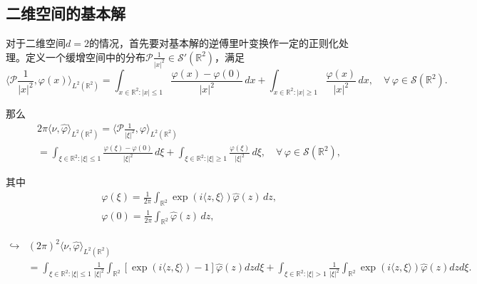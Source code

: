 \subsection{二维空间的基本解}
对于二维空间$d=2$的情况，首先要对基本解的逆傅里叶变换作一定的正则化处理\citep{Vladimirov:1971ti}。定义一个缓增空间中的分布$\mathcal{P}\frac{1}{|x|^2} \in \mathcal{S}'(\mathbb{R}^2)$，满足
\begin{equation*}
  \langle \mathcal{P} \frac{1}{|x|^{2}}, \varphi(x) \rangle_{L^{2}(\mathbb{R}^2)}
  = \int_{x \in \mathbb{R}^2 : |x| \le 1}
  \frac{\varphi(x) - \varphi(0)}{|x|^2} \, dx
  + \int_{x \in \mathbb{R}^2: |x| \ge 1}
  \frac{\varphi(x)}{|x|^2} \, dx, \quad \forall \, \varphi \in \mathcal{S}(\mathbb{R}^2).
\end{equation*}

那么
\begin{equation*}
\begin{split}
  &2 \pi \langle \nu, \widehat{\varphi} \rangle_{L^2(\mathbb{R}^2)}
   = \langle \mathcal{P} \frac{1}{|\xi|^{2}}, \varphi \rangle_{L^2(\mathbb{R}^2)} \\
  &= \int_{\xi \in \mathbb{R}^2 : |\xi| \le 1}
   \frac{\varphi(\xi) - \varphi(0)}{|\xi|^2} \, d \xi
   + \int_{\xi \in \mathbb{R}^2: |\xi| \ge 1}
   \frac{\varphi(\xi)}{|\xi|^2} \, d \xi, \quad \forall \, \varphi \in \mathcal{S}(\mathbb{R}^2),
\end{split}
\end{equation*}

其中
\begin{equation*}
  \begin{split}
    & \varphi(\xi) = \frac{1}{2 \pi} \int_{\mathbb{R}^2}
    \exp \left( i \langle z, \xi \rangle \right)
    \widehat{\varphi}(z)
    \, dz, \\
    & \varphi(0) = \frac{1}{2 \pi} \int_{\mathbb{R}^2}
    \widehat{\varphi}(z) \, dz,
  \end{split}
\end{equation*}

\begin{equation*}
\begin{split}
  \hookrightarrow &
  \left( 2 \pi \right)^2 \langle \nu, \widehat{\varphi} \rangle_{L^2(\mathbb{R}^2)} \\
  & = \int_{\xi \in \mathbb{R}^2: |\xi| \le 1}
  \frac{1}{|\xi|^2}
  \int_{\mathbb{R}^2}
  \left[ \exp \left( i \langle z, \xi \rangle \right) - 1 \right]
  \widehat{\varphi}(z)
  d z d \xi
  + \int_{\xi \in \mathbb{R}^2: |\xi| > 1}
  \frac{1}{|\xi|^2}
  \int_{\mathbb{R}^2}
  \exp \left( i \langle z, \xi \rangle \right)
  \widehat{\varphi}(z)
  d z d \xi.
\end{split}
\end{equation*}

